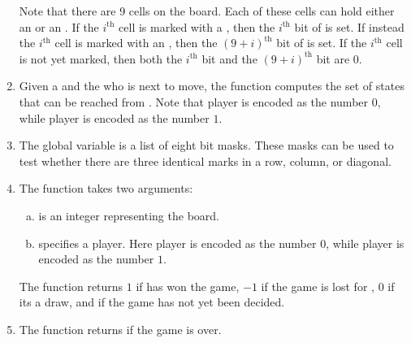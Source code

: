 \begin{enumerate}
      Note that there are 9 cells on the board.  Each of these cells can hold either an  or an
      .  If the $i^\textrm{th}$ cell is marked with a , then the $i^\textrm{th}$ bit of
       is set.  If instead the $i^\textrm{th}$ cell is marked with an , then the
      $(9+i)^\textrm{th}$ bit of  is set.  If the $i^\textrm{th}$ cell is not yet marked, then both the
      $i^\textrm{th}$ bit and the $(9+i)^\textrm{th}$ bit are $0$.   
\item Given a  and the  who is next to move, the function 
      computes the set of states that can be reached from .  Note that player  is
      encoded as the number $0$, while player  is encoded as the number $1$.
\item The global variable  is a list of eight bit masks.  These masks can be used to test
      whether there are three identical marks in a row, column, or diagonal. 
\item The function  takes two arguments:
      \begin{enumerate}[(a)]
      \item {}  is an integer representing the board.
      \item {} specifies a player. Here player  is encoded as the number $0$, while
            player  is encoded as the number $1$.
      \end{enumerate}
      The function returns $1$ if  has won the game, $-1$ if the game is lost for
      , $0$ if its a draw, and  if the game has not yet been decided.
\item The function  returns  if the game is over.
\end{enumerate}

